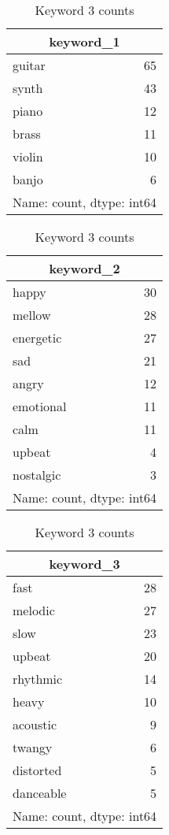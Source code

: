 \documentclass{article}
\begin{document}
\begin{table}[h]
\centering
\begin{minipage}{0.3\textwidth}
\centering
\begin{tabular}{|l|r|}
    \hline
    \multicolumn{2}{|c|}{\textbf{keyword\_1}} \\
    \hline
    guitar & 65 \\
    synth & 43 \\
    piano & 12 \\
    brass & 11 \\
    violin & 10 \\
    banjo & 6 \\
    \hline
    \multicolumn{2}{|c|}{Name: count, dtype: int64} \\
    \hline
\end{tabular}
\caption{Keyword 1 counts}
\label{tab:keyword1_counts}
\end{minipage}
\hfill
\begin{minipage}{0.3\textwidth}
\centering
\begin{tabular}{|l|r|}
    \hline
    \multicolumn{2}{|c|}{\textbf{keyword\_2}} \\
    \hline
    happy & 30 \\
    mellow & 28 \\
    energetic & 27 \\
    sad & 21 \\
    angry & 12 \\
    emotional & 11 \\
    calm & 11 \\
    upbeat & 4 \\
    nostalgic & 3 \\
    \hline
    \multicolumn{2}{|c|}{Name: count, dtype: int64} \\
    \hline
\end{tabular}
\caption{Keyword 2 counts}
\label{tab:keyword2_counts}
\end{minipage}
\hfill
\begin{minipage}{0.3\textwidth}
\centering
\begin{tabular}{|l|r|}
    \hline
    \multicolumn{2}{|c|}{\textbf{keyword\_3}} \\
    \hline
    fast & 28 \\
    melodic & 27 \\
    slow & 23 \\
    upbeat & 20 \\
    rhythmic & 14 \\
    heavy & 10 \\
    acoustic & 9 \\
    twangy & 6 \\
    distorted & 5 \\
    danceable & 5 \\
    \hline
    \multicolumn{2}{|c|}{Name: count, dtype: int64} \\
    \hline
\end{tabular}
\caption{Keyword 3 counts}
\label{tab:keyword3_counts}
\end{minipage}
\end{table}
\end{document}
